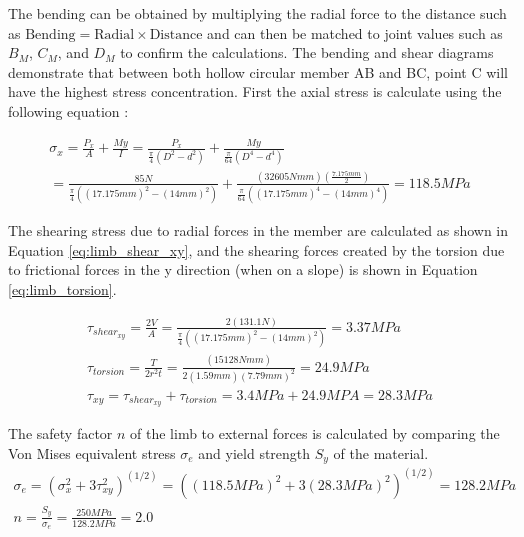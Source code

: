 The bending can be obtained by multiplying the radial force to the distance such as $ \text{Bending} = \text{Radial} \times \text{Distance} $ and can then be matched to joint values such as $B_M$, $C_M$, and $D_M$ to confirm the calculations.
The bending and shear diagrams demonstrate that between both hollow circular member AB and BC, point C will have the highest stress concentration. First the axial stress is calculate using the following equation \cite{budynas_shigleys_2015}:

\begin{equation}
\begin{split}
        \sigma_x = \frac{P_x}{A} + \frac{My}{I} =  \frac{P_x}{\frac{\pi}{4} (D^2-d^2)} + \frac{My}{\frac{\pi}{64} (D^4-d^4)} 
        \\
        = \frac{85N}{\frac{\pi}{4} ((17.175mm)^2-(14mm)^2)} + \frac{(32605Nmm)(\frac{7.175mm}{2})}{\frac{\pi}{64} ((17.175mm)^4-(14mm)^4)} = 118.5 MPa   \label{eq:limb_axial}
\end{split}
\end{equation}

The shearing stress due to radial forces in the member are calculated as shown in Equation \ref{eq:limb_shear_xy}, and the shearing forces created by the torsion due to frictional forces in the y direction (when on a slope) is shown in Equation \ref{eq:limb_torsion}.

\begin{gather}
    \tau_{shear_{xy}} = \frac{2V}{A}= \frac{2(131.1N)}{\frac{\pi}{4} ((17.175mm)^2-(14mm)^2)} = 3.37 MPa \label{eq:limb_shear_xy}
    \\
    \tau_{torsion} = \frac{T}{2r^2t} = \frac{(15128Nmm)}{2(1.59mm)(7.79mm)^2} = 24.9 MPa
    \label{eq:limb_torsion}
    \\
    \tau_{xy} = \tau_{shear_{xy}} +  \tau_{torsion}= 3.4 MPa + 24.9MPA = 28.3 MPa
\end{gather}

The safety factor $n$ of the limb to external forces is calculated by comparing the Von Mises equivalent stress $\sigma_e$ and yield strength $S_y$ of the material.
\begin{gather}
\sigma_e = (\sigma_x^2+3\tau_{xy}^2)^{(1/2)} = ((118.5 MPa)^2 + 3(28.3 MPa)^2)^{(1/2)} = 128.2 MPa  \label{eq:limb_equivalent}
\\
n = \frac{S_y}{\sigma_e} = \frac{250 MPa}{128.2 MPa} = 2.0
\end{gather}



